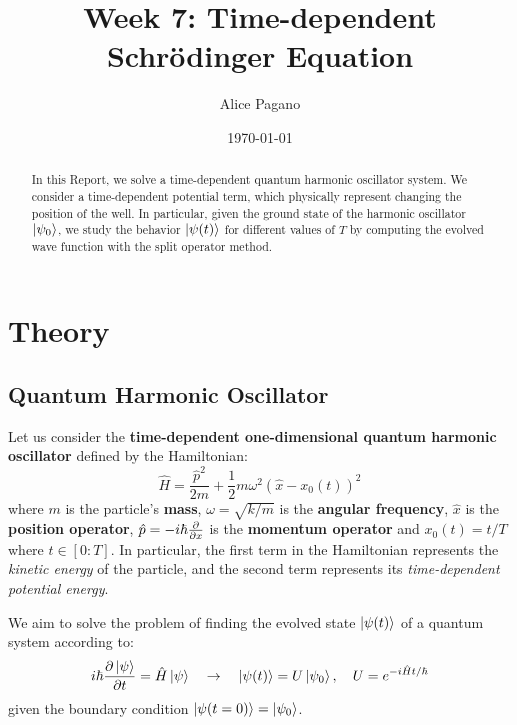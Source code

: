 \documentclass[rmp,10pt,onecolumn,fleqn,notitlepage]{revtex4-1}
\begin{document}
\title{Week 7: Time-dependent Schrödinger Equation}
\author{Alice Pagano}
\date{\today}

\begin{abstract}
In this Report, we solve a time-dependent quantum harmonic oscillator system. We consider a time-dependent potential term, which physically represent changing the position of the well.
In particular, given the ground state of the harmonic oscillator \( \ket{\psi _0}  \), we study the behavior \( \ket{\psi (t)}  \) for different values of \( T \) by computing the evolved wave function with the split operator method.
\end{abstract}

\maketitle


\section{Theory}

\subsection{Quantum Harmonic Oscillator}

Let us consider the \textbf{time-dependent one-dimensional quantum harmonic oscillator} defined by the Hamiltonian:
\begin{equation}
  \hat{H} = \frac{\hat{p}^2}{2m} +\frac{1}{2} m \omega ^2 (\hat{x} - x_0(t))^2
\end{equation}
where \( m \) is the particle's \textbf{mass}, \( \omega = \sqrt{k/m}  \) is the \textbf{angular frequency}, \( \hat{x}  \) is the \textbf{position operator}, \( \hat{p} = - i \hbar \pdv{}{x}  \) is the \textbf{momentum operator} and \( x_0 (t) = t/T \) where \( t \in [0:T] \).
In particular, the first term in the Hamiltonian represents the \emph{kinetic energy} of the particle, and the second term represents its \emph{time-dependent potential energy}.

We aim to solve the problem of finding the evolved state \( \ket{\psi (t)}  \) of a quantum system according to:
\begin{equation}
  i \hbar  \pdv{\ket{\psi } }{t} = \hat{H} \ket{\psi } \quad \rightarrow  \quad  \ket{\psi (t) } = U \ket{\psi _0}, \quad U = e^{- i \hat{H}  t / \hbar }
\end{equation}
given the boundary condition \( \ket{\psi (t=0)} = \ket{\psi _0}   \).
\end{document}
